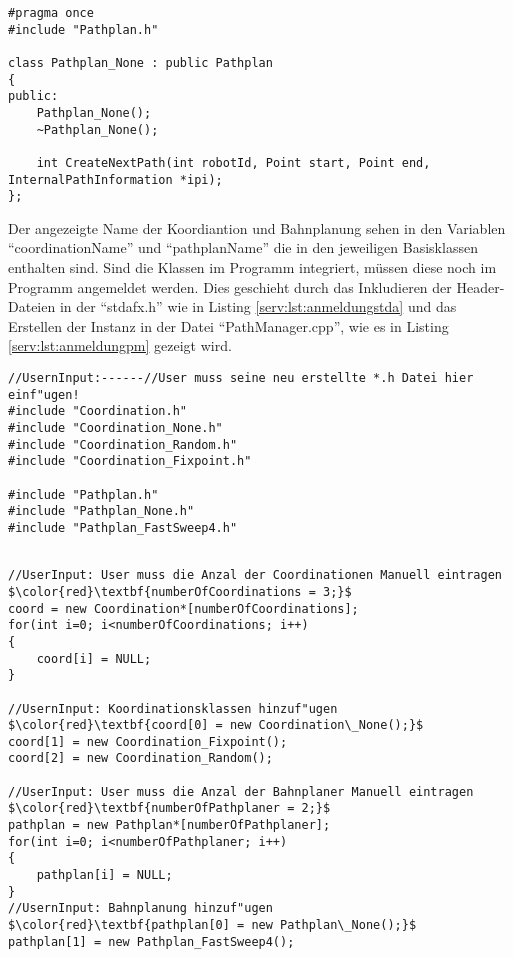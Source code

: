 \begin{lstlisting}[frame=tb,captionpos=b,caption=Bahnplantemplate., label=serv:lst:bahnplantemp]
#pragma once
#include "Pathplan.h"

class Pathplan_None : public Pathplan
{
public:
    Pathplan_None();
    ~Pathplan_None();

    int CreateNextPath(int robotId, Point start, Point end, InternalPathInformation *ipi);
};
\end{lstlisting}

Der angezeigte Name der Koordiantion und Bahnplanung sehen in den Variablen "`coordinationName"' und "`pathplanName"' die in den jeweiligen Basisklassen enthalten sind. Sind die Klassen im Programm integriert, müssen diese noch im Programm angemeldet werden. Dies geschieht durch das Inkludieren der Header-Dateien in der "`stdafx.h"' wie in Listing \ref{serv:lst:anmeldungstda} und das Erstellen der Instanz in der Datei "`PathManager.cpp"', wie es in Listing \ref{serv:lst:anmeldungpm} gezeigt wird.

\begin{lstlisting}[frame=tb,captionpos=b,caption=Anmeldung der Klassen in stdafx.h., label=serv:lst:anmeldungstda]
//UsernInput:------//User muss seine neu erstellte *.h Datei hier einf"ugen!                                    
#include "Coordination.h"
#include "Coordination_None.h"
#include "Coordination_Random.h"
#include "Coordination_Fixpoint.h"

#include "Pathplan.h"
#include "Pathplan_None.h"
#include "Pathplan_FastSweep4.h"
\end{lstlisting}

\begin{lstlisting}[frame=tb,mathescape=true,captionpos=b,caption=Anmeldung der Klassen in PathManager.cpp., label=serv:lst:anmeldungpm]

//UserInput: User muss die Anzal der Coordinationen Manuell eintragen                                          
$\color{red}\textbf{numberOfCoordinations = 3;}$
coord = new Coordination*[numberOfCoordinations];
for(int i=0; i<numberOfCoordinations; i++)
{
    coord[i] = NULL;
}

//UsernInput: Koordinationsklassen hinzuf"ugen                
$\color{red}\textbf{coord[0] = new Coordination\_None();}$
coord[1] = new Coordination_Fixpoint();
coord[2] = new Coordination_Random();  

//UserInput: User muss die Anzal der Bahnplaner Manuell eintragen                                          
$\color{red}\textbf{numberOfPathplaner = 2;}$
pathplan = new Pathplan*[numberOfPathplaner];
for(int i=0; i<numberOfPathplaner; i++)
{
    pathplan[i] = NULL;
}
//UsernInput: Bahnplanung hinzuf"ugen
$\color{red}\textbf{pathplan[0] = new Pathplan\_None();}$
pathplan[1] = new Pathplan_FastSweep4();

\end{lstlisting}
